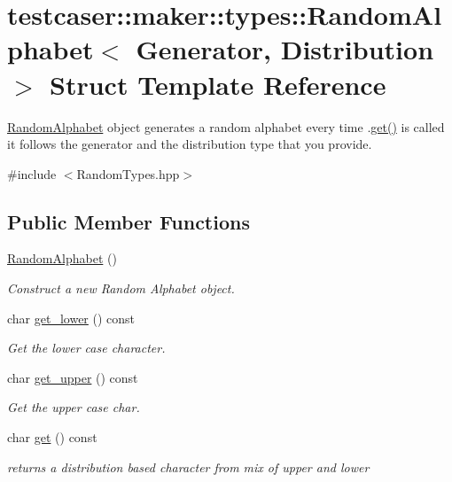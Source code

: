 \hypertarget{structtestcaser_1_1maker_1_1types_1_1RandomAlphabet}{}\section{testcaser\+:\+:maker\+:\+:types\+:\+:Random\+Alphabet$<$ Generator, Distribution $>$ Struct Template Reference}
\label{structtestcaser_1_1maker_1_1types_1_1RandomAlphabet}


\mbox{\hyperlink{structtestcaser_1_1maker_1_1types_1_1RandomAlphabet}{Random\+Alphabet}} object generates a random alphabet every time .\mbox{\hyperlink{structtestcaser_1_1maker_1_1types_1_1RandomAlphabet_a6498f1e44b84cb66c1c1dc6de642b218}{get()}} is called it follows the generator and the distribution type that you provide.  




{\ttfamily \#include $<$Random\+Types.\+hpp$>$}

\subsection*{Public Member Functions}
\begin{DoxyCompactItemize}
\item 
\mbox{\hyperlink{structtestcaser_1_1maker_1_1types_1_1RandomAlphabet_ab4cab36c953e73837f726215309577ba}{Random\+Alphabet}} ()
\begin{DoxyCompactList}\small\item\em Construct a new Random Alphabet object. \end{DoxyCompactList}\item 
char \mbox{\hyperlink{structtestcaser_1_1maker_1_1types_1_1RandomAlphabet_a6fccb771852c1f44ed268a9867589026}{get\+\_\+lower}} () const
\begin{DoxyCompactList}\small\item\em Get the lower case character. \end{DoxyCompactList}\item 
char \mbox{\hyperlink{structtestcaser_1_1maker_1_1types_1_1RandomAlphabet_a398a597e207dea4a284537feb8fc6086}{get\+\_\+upper}} () const
\begin{DoxyCompactList}\small\item\em Get the upper case char. \end{DoxyCompactList}\item 
char \mbox{\hyperlink{structtestcaser_1_1maker_1_1types_1_1RandomAlphabet_a6498f1e44b84cb66c1c1dc6de642b218}{get}} () const
\begin{DoxyCompactList}\small\item\em returns a distribution based character from mix of upper and lower \end{DoxyCompactList}\end{DoxyCompactItemize}
